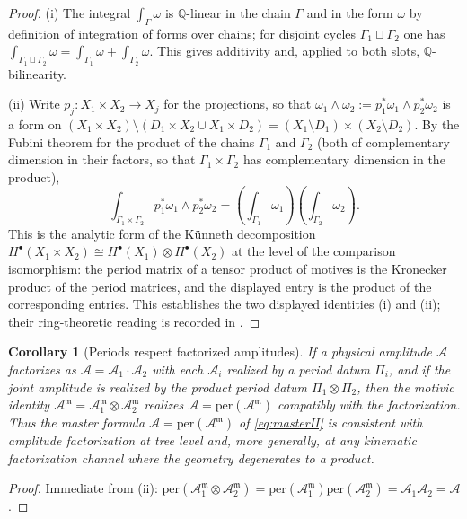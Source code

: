 \documentclass[12pt]{article}
\newtheorem{corollary}[theorem]{Corollary}
\theoremstyle{definition}
\theoremstyle{remark}
\newcommand{\per}{\mathrm{per}}
\newcommand{\Am}{\mathcal{A}}
\newcommand{\Amm}{\mathcal{A}^{\mathfrak{m}}}
\newcommand{\Qbb}{\mathbb{Q}}
\begin{document}
\begin{proof}
(i) The integral $\int_\Gamma\omega$ is $\Qbb$-linear in the chain $\Gamma$ and in the
form $\omega$ by definition of integration of forms over chains; for disjoint cycles
$\Gamma_1\sqcup\Gamma_2$ one has
$\int_{\Gamma_1\sqcup\Gamma_2}\omega=\int_{\Gamma_1}\omega+\int_{\Gamma_2}\omega$. This gives
additivity and, applied to both slots, $\Qbb$-bilinearity.

(ii) Write $p_j\colon X_1\times X_2\to X_j$ for the projections, so that
$\omega_1\wedge\omega_2 := p_1^\ast\omega_1\wedge p_2^\ast\omega_2$ is a form on
$(X_1\times X_2)\setminus(D_1\times X_2\cup X_1\times D_2)=(X_1\setminus D_1)\times
(X_2\setminus D_2)$. By the Fubini theorem for the product of the chains $\Gamma_1$ and
$\Gamma_2$ (both of complementary dimension in their factors, so that
$\Gamma_1\times\Gamma_2$ has complementary dimension in the product),
\[
\int_{\Gamma_1\times\Gamma_2}p_1^\ast\omega_1\wedge p_2^\ast\omega_2
=\left(\int_{\Gamma_1}\omega_1\right)\left(\int_{\Gamma_2}\omega_2\right).
\]
This is the analytic form of the K\"unneth decomposition
$H^\bullet(X_1\times X_2)\cong H^\bullet(X_1)\otimes H^\bullet(X_2)$ at the level of the
comparison isomorphism: the period matrix of a tensor product of motives is the Kronecker
product of the period matrices, and the displayed entry is the product of the corresponding
entries. This establishes the two displayed identities (i) and (ii); their ring-theoretic
reading is recorded in .
\end{proof}

\begin{corollary}[Periods respect factorized amplitudes]
\label{cor:factorize}
If a physical amplitude $\Am$ factorizes as $\Am=\Am_1\cdot\Am_2$ with each $\Am_i$
realized by a period datum $\Pi_i$, and if the joint amplitude is realized by the product
period datum $\Pi_1\otimes\Pi_2$, then the motivic identity $\Amm=\Amm_1\otimes\Amm_2$
realizes $\Am=\per(\Amm)$ compatibly with the factorization. Thus the master formula
$\Am=\per(\Amm)$ of \eqref{eq:masterII} is consistent with amplitude factorization at
tree level and, more generally, at any kinematic factorization channel where the geometry
degenerates to a product.
\end{corollary}

\begin{proof}
Immediate from (ii): $\per(\Amm_1\otimes\Amm_2)=
\per(\Amm_1)\per(\Amm_2)=\Am_1\Am_2=\Am$.
\end{proof}
\end{document}
